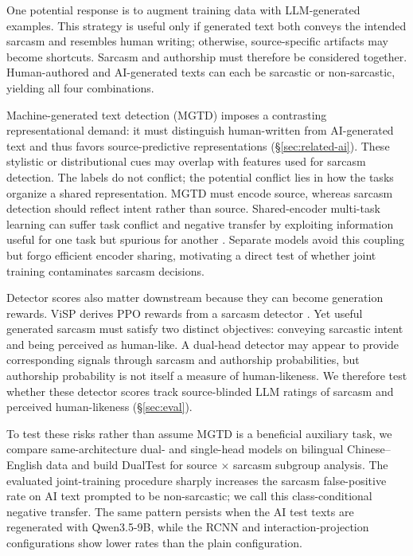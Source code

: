 \documentclass[11pt]{article}
\newcommand{\Sref}[1]{\hyperref[#1]{\S\ref*{#1}}}
\begin{document}
One potential response is to augment training data with LLM-generated examples. This strategy is useful only if generated text both conveys the intended sarcasm and resembles human writing; otherwise, source-specific artifacts may become shortcuts. Sarcasm and authorship must therefore be considered together. Human-authored and AI-generated texts can each be sarcastic or non-sarcastic, yielding all four combinations.

Machine-generated text detection (MGTD) imposes a contrasting representational demand: it must distinguish human-written from AI-generated text and thus favors source-predictive representations \citep{guo2023hc3,wang2024m4} (\Sref{sec:related-ai}). These stylistic or distributional cues may overlap with features used for sarcasm detection. The labels do not conflict; the potential conflict lies in how the tasks organize a shared representation. MGTD must encode source, whereas sarcasm detection should reflect intent rather than source. Shared-encoder multi-task learning can suffer task conflict and negative transfer by exploiting information useful for one task but spurious for another \citep{mueller2022taskconflict,hu2022spurious}. Separate models avoid this coupling but forgo efficient encoder sharing, motivating a direct test of whether joint training contaminates sarcasm decisions.

Detector scores also matter downstream because they can become generation rewards. ViSP derives PPO rewards from a sarcasm detector \citep{wang2026visp}. Yet useful generated sarcasm must satisfy two distinct objectives: conveying sarcastic intent and being perceived as human-like. A dual-head detector may appear to provide corresponding signals through sarcasm and authorship probabilities, but authorship probability is not itself a measure of human-likeness. We therefore test whether these detector scores track source-blinded LLM ratings of sarcasm and perceived human-likeness (\Sref{sec:eval}).

To test these risks rather than assume MGTD is a beneficial auxiliary task, we compare same-architecture dual- and single-head models on bilingual Chinese--English data and build DualTest for source $\times$ sarcasm subgroup analysis. The evaluated joint-training procedure sharply increases the sarcasm false-positive rate on AI text prompted to be non-sarcastic; we call this class-conditional negative transfer. The same pattern persists when the AI test texts are regenerated with Qwen3.5-9B, while the RCNN and interaction-projection configurations show lower rates than the plain configuration.
\end{document}
